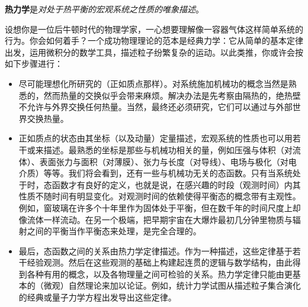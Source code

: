 

\textbf{热力学}是\emph{对处于热平衡的宏观系统之性质的唯象描述}。

设想你是一位后牛顿时代的物理学家，一心想要理解像一容器气体这样简单系统的行为。你会如何着手？一个成功物理理论的范本是经典力学：它从简单的基本定律出发，运用微积分的数学工具，描述粒子纷繁复杂的运动。以此类推，你或许会按如下步骤进行：

\begin{itemize}[itemsep=0.3em, topsep=0.3em]
  \item 尽可能理想化所研究的（正如质点那样）。对系统施加机械功的概念当然是熟悉的，然而热量的交换似乎会带来麻烦。解决办法是先考察由隔热的，绝热壁不允许与外界交换任何热量。当然，最终还必须研究，它们可以通过与外部世界交换热量。

  \item 正如质点的状态由其坐标（以及动量）定量描述，宏观系统的性质也可以用若干或来描述。最熟悉的坐标是那些与机械功相关的量，例如压强与体积（对流体）、表面张力与面积（对薄膜）、张力与长度（对导线）、电场与极化（对电介质）等等。我们将会看到，还有一些与机械功无关的态函数。只有当系统处于时，态函数才有良好的定义，也就是说，在感兴趣的时段（观测时间）内其性质不随时间有明显变化。对观测时间的依赖使得平衡态的概念带有主观性。例如，窗玻璃在许多个十年里作为固体处于平衡，但在数千年的时间尺度上却像流体一样流动。在另一个极端，把早期宇宙在大爆炸最初几分钟里物质与辐射之间的平衡当作平衡态来处理，是完全合理的。
  \item 最后，态函数之间的关系由热力学定律描述。作为一种描述，这些定律基于若干经验观测。然后在这些观测的基础上构建起连贯的逻辑与数学结构，由此得到各种有用的概念，以及各物理量之间可检验的关系。热力学定律只能由更基本的（微观）自然理论来加以论证。例如，统计力学试图从描述粒子集合演化的经典或量子力学方程出发导出这些定律。
\end{itemize}

